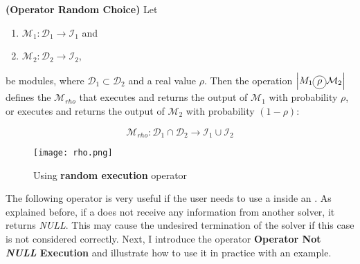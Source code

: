 \begin{definition}\label{op:rho}
{\bf (Operator Random Choice)} Let
\begin{enumerate}%
	\item $\mathcal{M}_1 : \mathcal{D}_1 \rightarrow \mathcal{I}_1$ and  
	\item $\mathcal{M}_2 : \mathcal{D}_2 \rightarrow \mathcal{I}_2$,
\end{enumerate}%
be modules, where $\mathcal{D}_1 \subset \mathcal{D}_2$ %
and a real value $\rho$. Then the operation $\left|M_1\circled{$\rho$}\mathcal{M}_2\right|$ defines the \cm{} $\mathcal{M}_{rho}$ that executes and returns the output of $\mathcal{M}_1$ with probability $\rho$, or executes and returns the output of $\mathcal{M}_2$ with probability $(1-\rho)$:

\[
\mathcal{M}_{rho}:\mathcal{D}_1\cap\mathcal{D}_2 \rightarrow \mathcal{I}_1 \cup \mathcal{I}_2 
\]
\end{definition}


\begin{figure}[h]
	\centering	
	\texttt{[image: rho.png]}
	\caption{Using {\bf random execution} operator}\label{fig:rho_example}
\end{figure}

The following operator is very useful if the user needs to use a \opch{} inside an \as{}. As explained before, if a \opch{} does not receive any information from another solver, it returns {\it NULL}. This may cause the undesired termination of the solver if this case is not considered correctly. Next, I introduce the operator \textbf{Operator Not {\it NULL} Execution} and illustrate how to use it in practice with an example.

